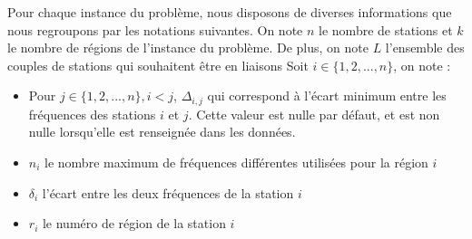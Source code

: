 \documentclass[a4paper, 10pt]{article}
\begin{document}
      Pour chaque instance du problème, nous disposons de diverses informations que nous regroupons par les notations suivantes.
      On note $n$ le nombre de stations et $k$ le nombre de régions de l'instance du problème. De plus, on note $L$ l'ensemble des couples de stations qui souhaitent être en liaisons
      Soit $i \in \{1,2,...,n \}$, on note :
      \begin{itemize}
        \item Pour $ j \in \{1,2,...,n \}, i<j$, $\Delta_{i,j}$ qui correspond à l'écart minimum entre les fréquences des stations $i$ et $j$. Cette valeur est nulle par défaut, et est non nulle lorsqu'elle est renseignée dans les données.
        \item $n_{i}$ le nombre maximum de fréquences différentes utilisées pour la région $i$
        \item $\delta_{i}$ l'écart entre les deux fréquences de la station $i$
        \item $r_{i}$ le numéro de région de la station $i$
      \end{itemize}
\end{document}
